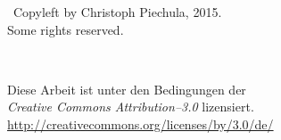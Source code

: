\newpage 
\thispagestyle{empty}
\vspace*{0in}
\begin{center}
    {\LARGE{}}\ Copyleft by Christoph Piechula, 2015. \\
    Some rights reserved. \\
    \vspace{1in}
    \begin{minipage}[c]{0.2\linewidth}
        \hfill {\Huge \ccLogo~\ccAttribution}
    \end{minipage}
    \hspace{0.1cm}
    \begin{minipage}[c]{0.7\linewidth}
        Diese Arbeit ist unter den Bedingungen der \\
        \textit{Creative Commons Attribution--3.0} lizensiert. \\
        \url{http://creativecommons.org/licenses/by/3.0/de/}
    \end{minipage}
\end{center}
\clearpage
{}
\setcounter{page}{-1}
